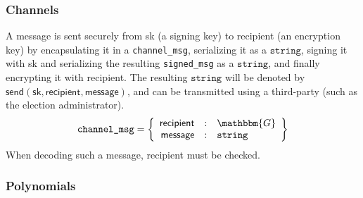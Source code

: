 \documentclass[a4paper]{article}
\newcommand{\G}{\mathbbm{G}}
\newcommand{\jstring}{\texttt{string}}
\begin{document}
\subsubsection{Channels}
\label{channels}

A \textsf{message} is sent securely from \textsf{sk} (a signing key)
to \textsf{recipient} (an encryption key) by encapsulating it in a
\texttt{channel\_msg}, serializing it as a $\jstring$, signing it with
\textsf{sk} and serializing the resulting \texttt{signed\_msg} as a
$\jstring$, and finally encrypting it with \textsf{recipient}. The
resulting $\jstring$ will be denoted by
$\textsf{send}(\textsf{sk},\textsf{recipient},\textsf{message})$, and
can be transmitted using a third-party (such as the election
administrator).
\begin{gather*}
  \texttt{channel\_msg}=\left\{
    \begin{array}{rcl}
      \textsf{recipient}&:&\G\\
      \textsf{message}&:&\jstring
    \end{array}
  \right\}
\end{gather*}
When decoding such a message, \textsf{recipient} must be checked.

\subsubsection{Polynomials}
\label{polynomials}
\end{document}
